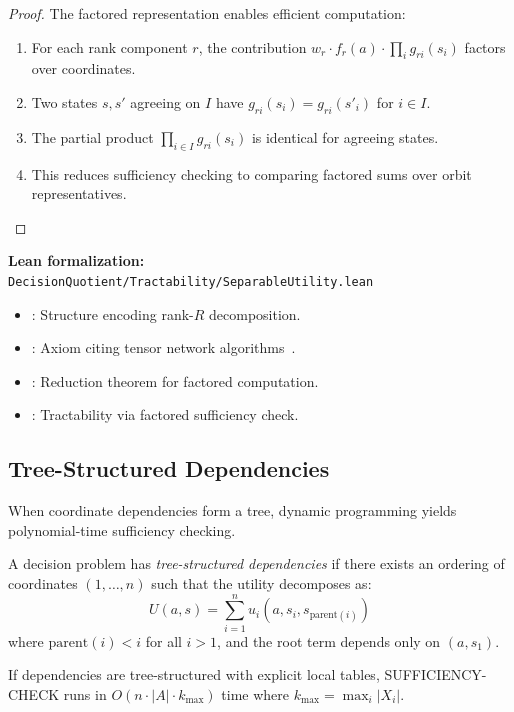 \begin{proof}
The factored representation enables efficient computation:
\begin{enumerate}
\item For each rank component $r$, the contribution $w_r \cdot f_r(a) \cdot \prod_i g_{ri}(s_i)$ factors over coordinates.
\item Two states $s, s'$ agreeing on $I$ have $g_{ri}(s_i) = g_{ri}(s'_i)$ for $i \in I$.
\item The partial product $\prod_{i \in I} g_{ri}(s_i)$ is identical for agreeing states.
\item This reduces sufficiency checking to comparing factored sums over orbit representatives.
\end{enumerate}
\end{proof}

\noindent\textbf{Lean formalization:} \texttt{DecisionQuotient/Tractability/SeparableUtility.lean}
\begin{itemize}
\item {}: Structure encoding rank-$R$ decomposition.
\item {}: Axiom citing tensor network algorithms~\cite{kolda2009tensor,cichocki2016tensor}.
\item {}: Reduction theorem for factored computation.
\item {}: Tractability via factored sufficiency check.
\end{itemize}

\subsection{Tree-Structured Dependencies}\label{sec:tract-tree}

When coordinate dependencies form a tree, dynamic programming yields polynomial-time sufficiency checking.

\begin{definition}\label{def:tree-struct}
A decision problem has \emph{tree-structured dependencies} if there exists an ordering of coordinates $(1, \ldots, n)$ such that the utility decomposes as:
\[
U(a, s) = \sum_{i=1}^n u_i(a, s_i, s_{\mathrm{parent}(i)})
\]
where $\mathrm{parent}(i) < i$ for all $i > 1$, and the root term depends only on $(a, s_1)$.
\end{definition}

\begin{theorem}\label{thm:tree-struct}
If dependencies are tree-structured with explicit local tables, SUFFICIENCY-CHECK runs in $O(n \cdot |A| \cdot k_{\max})$ time where $k_{\max} = \max_i |X_i|$.
\end{theorem}

